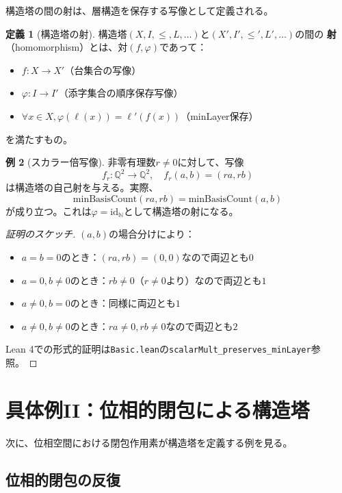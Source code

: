 \documentclass[a4paper,12pt]{ltjsarticle}
\theoremstyle{definition}
\newtheorem{definition}{定義}[section]
\newtheorem{example}[definition]{例}
\begin{document}
構造塔の間の射は、層構造を保存する写像として定義される。

\begin{definition}[構造塔の射]
構造塔$(X, I, \leq, L, \ldots)$と$(X', I', \leq', L', \ldots)$の間の
\textbf{射}（homomorphism）とは、対$(f, \varphi)$であって：
\begin{itemize}
\item $f: X \to X'$（台集合の写像）
\item $\varphi: I \to I'$（添字集合の順序保存写像）
\item $\forall x \in X, \varphi(\ell(x)) = \ell'(f(x))$（minLayer保存）
\end{itemize}
を満たすもの。
\end{definition}

\begin{example}[スカラー倍写像]
非零有理数$r \neq 0$に対して、写像
\[
f_r: \mathbb{Q}^2 \to \mathbb{Q}^2, \quad f_r(a, b) = (ra, rb)
\]
は構造塔の自己射を与える。実際、
\[
\mathrm{minBasisCount}(ra, rb) = \mathrm{minBasisCount}(a, b)
\]
が成り立つ。これは$\varphi = \mathrm{id}_{\mathbb{N}}$として構造塔の射になる。
\end{example}

\begin{proof}[証明のスケッチ]
$(a, b)$の場合分けにより：
\begin{itemize}
\item $a = b = 0$のとき：$(ra, rb) = (0, 0)$なので両辺とも$0$
\item $a = 0, b \neq 0$のとき：$rb \neq 0$（$r \neq 0$より）なので両辺とも$1$
\item $a \neq 0, b = 0$のとき：同様に両辺とも$1$
\item $a \neq 0, b \neq 0$のとき：$ra \neq 0, rb \neq 0$なので両辺とも$2$
\end{itemize}
Lean 4での形式的証明は\texttt{Basic.lean}の\texttt{scalarMult\_preserves\_minLayer}参照。
\end{proof}

\section{具体例II：位相的閉包による構造塔}

次に、位相空間における閉包作用素が構造塔を定義する例を見る。

\subsection{位相的閉包の反復}
\end{document}
